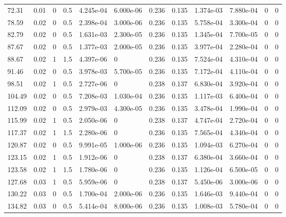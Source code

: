 \documentclass[preview]{standalone}
\begin{document}
{{\begin{tabular}{L{1.2cm}C{1.2cm} C{0.3cm}C{0.5cm} C{1.4cm}C{1.4cm} C{1.4cm}C{1.4cm} C{1.6cm}C{1.6cm} C{1.6cm}C{1.6cm}}
  72.31  &  0.01  & 0     & 0.5 &  4.245e-04  & 6.000e-06  &  0.236&   0.135& 1.374e-03 & 7.880e-04   &  0 & 0  \\ 
  78.59  &  0.02  & 0     & 0.5 &  2.398e-04  & 3.000e-06  &  0.236&   0.135& 5.758e-04 & 3.300e-04   &  0 & 0  \\ 
  82.79  &  0.02  & 0     & 0.5 &  1.631e-03  & 2.300e-05  &  0.236&   0.135& 1.345e-04 & 7.700e-05   &  0 & 0  \\ 
  87.67  &  0.02  & 0     & 0.5 &  1.377e-03  & 2.000e-05  &  0.236&   0.135& 3.977e-04 & 2.280e-04   &  0 & 0  \\ 
  88.67  &  0.02  & 1     & 1.5 &  4.397e-06  & 0  &  0.236&   0.135& 7.524e-04 & 4.310e-04   &  0 & 0  \\ 
  91.46  &  0.02  & 0     & 0.5 &  3.978e-03  & 5.700e-05  &  0.236&   0.135& 7.172e-04 & 4.110e-04   &  0 & 0  \\ 
  98.51  &  0.02  & 1     & 0.5 &  2.727e-06  & 0  &  0.238&   0.137& 6.830e-04 & 3.920e-04   &  0 & 0  \\ 
  104.49  &  0.02  & 0     & 0.5 &  7.208e-03  & 1.030e-04  &  0.236&   0.135& 1.117e-03 & 6.400e-04   &  0 & 0  \\ 
  112.09  &  0.02  & 0     & 0.5 &  2.979e-03  & 4.300e-05  &  0.236&   0.135& 3.478e-04 & 1.990e-04   &  0 & 0  \\ 
  115.99  &  0.02  & 1     & 0.5 &  2.050e-06  & 0  &  0.238&   0.137& 4.747e-04 & 2.720e-04   &  0 & 0  \\ 
  117.37  &  0.02  & 1     & 1.5 &  2.280e-06  & 0  &  0.236&   0.135& 7.565e-04 & 4.340e-04   &  0 & 0  \\ 
  120.87  &  0.02  & 0     & 0.5 &  9.991e-05  & 1.000e-06  &  0.236&   0.135& 1.094e-03 & 6.270e-04   &  0 & 0  \\ 
  123.15  &  0.02  & 1     & 0.5 &  1.912e-06  & 0  &  0.238&   0.137& 6.380e-04 & 3.660e-04   &  0 & 0  \\ 
  123.58  &  0.02  & 1     & 1.5 &  1.780e-06  & 0  &  0.236&   0.135& 1.126e-04 & 6.500e-05   &  0 & 0  \\ 
  127.68  &  0.03  & 1     & 0.5 &  5.959e-06  & 0  &  0.238&   0.137& 5.450e-06 & 3.000e-06   &  0 & 0  \\ 
  130.22  &  0.03  & 0     & 0.5 &  1.700e-04  & 2.000e-06  &  0.236&   0.135& 1.646e-03 & 9.440e-04   &  0 & 0  \\ 
  134.82  &  0.03  & 0     & 0.5 &  5.414e-04  & 8.000e-06  &  0.236&   0.135& 1.008e-03 & 5.780e-04   &  0 & 0  \\ 

\end{tabular}}}
\end{document}
